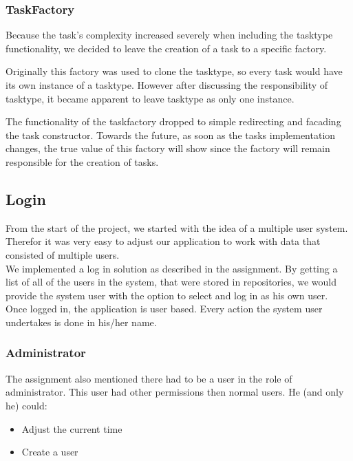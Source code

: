 			\subsubsection{TaskFactory}
			Because the task's complexity increased severely when including the tasktype functionality, we decided to leave the creation of a task to a specific factory.
			
			Originally this factory was used to clone the tasktype, so every task would have its own instance of a tasktype. However after discussing the responsibility of tasktype, it became apparent to leave tasktype as only one instance.

			The functionality of the taskfactory dropped to simple redirecting and facading the task constructor. Towards the future, as soon as the tasks implementation changes, the true value of this factory will show since the factory will remain responsible for the creation of tasks.
		
		\subsection{Login}
			From the start of the project, we started with the idea of a multiple user system. Therefor it was very easy to adjust our application to work with data that consisted of multiple users.\\
			We implemented a log in solution as described in the assignment. By getting a list of all of the users in the system, that were stored in repositories, we would provide the system user with the option to select and log in as his own user.\\
			Once logged in, the application is user based. Every action the system user undertakes is done in his/her name.
			\subsubsection{Administrator}
			The assignment also mentioned there had to be a user in the role of administrator. This user had other permissions then normal users. He (and only he) could:
			\begin{itemize}
				\item{Adjust the current time}
				\item{Create a user}
			\end{itemize}
			
